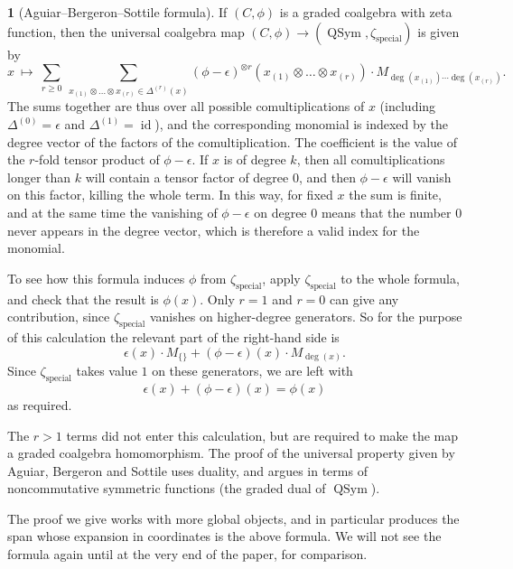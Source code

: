 \documentclass{amsart}
\DeclareMathOperator{\id}{id}
\newcommand{\QSym}{\operatorname{QSym}}
\theoremstyle{definition}
\theoremstyle{noname}
\newtheorem{blanko}[theorem]{}
\begin{document}
\begin{blanko}[Aguiar--Bergeron--Sottile formula]\label{ABS}
  If $(C,\phi)$ is a graded coalgebra with zeta function, then the universal coalgebra
  map $(C,\phi)\to(\QSym, 
  \zeta_{\operatorname{special}})$ is given by
  $$
  x \ \mapsto \ \sum_{r\geq 0} \ \sum_{x_{(1)}\otimes\dots\otimes x_{(r)}\in \Delta^{(r)}(x)}
  (\phi-\epsilon)^{\otimes r}(x_{(1)}\otimes\dots\otimes x_{(r)}) \cdot 
  M_{\deg(x_{(1)})\cdots \deg(x_{(r)})} .
  $$
  The sums together are thus over all possible comultiplications of $x$ (including 
  $\Delta^{(0)} =\epsilon$ and $\Delta^{(1)} = \id$), and 
  the corresponding monomial is indexed by the degree vector of the factors of the 
  comultiplication. The coefficient is the value of the $r$-fold tensor product of 
  $\phi-\epsilon$. If $x$ is of degree $k$, then all comultiplications longer than $k$
  will contain a tensor factor of degree $0$, and then $\phi-\epsilon$ will vanish on 
  this factor, killing the whole term. In this way, for fixed $x$ the sum is finite,
  and at the same time the vanishing of $\phi-\epsilon$ on degree $0$ means that 
  the number $0$ never appears in the degree vector, which is therefore a valid index for the 
  monomial.
\end{blanko}

To see how this formula induces $\phi$ from 
$\zeta_{\operatorname{special}}$,
apply $\zeta_{\operatorname{special}}$ to the whole formula, and check that the 
result is $\phi(x)$. Only $r=1$ and $r=0$ 
can give any contribution, since $\zeta_{\operatorname{special}}$ vanishes on 
higher-degree generators. So for the purpose of this calculation the relevant part of 
the right-hand side is
$$
  \epsilon(x) \cdot 
  M_{\{\}} 
  +
  (\phi-\epsilon)(x) \cdot 
  M_{\deg(x)} .
$$
Since $\zeta_{\operatorname{special}}$ takes value $1$ on these generators,
we are left with  
$$\epsilon(x)
  +
  (\phi-\epsilon)(x) = \phi(x)
$$
as required.

The $r>1$ terms did not enter this calculation, but are required to
make the map a graded coalgebra homomorphism. 
The proof of the universal property given by Aguiar, 
Bergeron and Sottile uses duality, and argues in terms of noncommutative 
symmetric functions (the graded dual of $\QSym$).

The proof we give works with more global objects, and in particular produces
the span
whose expansion in coordinates is the above formula. We will not see the formula
again until at the very end of the paper, for comparison.
\end{document}
